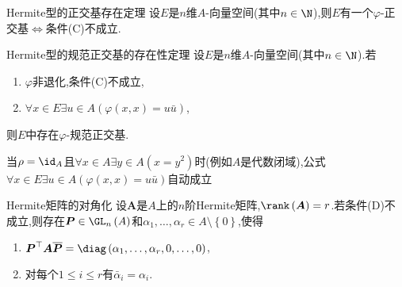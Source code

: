 \begin{theorem}{Hermite型的正交基存在定理}{}
	设$E$是$n$维$A$-向量空间(其中$n\in\N$),则$E$有一个$\varphi$-正交基$\iff$条件(C)不成立.
\end{theorem}

\begin{corollary}{Hermite型的规范正交基的存在性定理}{}
	设$E$是$n$维$A$-向量空间(其中$n\in\N$).若
	\begin{enumerate}
		\item $\varphi$非退化,条件(C)不成立,
		\item $\forall x\in E\exists u\in A\left(\varphi\left(x,x\right)=u\bar{u}\right)$,
	\end{enumerate}
	则$E$中存在$\varphi$-规范正交基.
\end{corollary}

\begin{remark}{}{}
	当$\rho=\id_{A}$且$\forall x\in A\exists y\in A\left(x=y^{2}\right)$时(例如$A$是代数闭域),公式$\forall x\in E\exists u\in A\left(\varphi\left(x,x\right)=u\bar{u}\right)$自动成立
\end{remark}

\begin{corollary}{Hermite矩阵的对角化}{}
	设$\boldsymbol{A}$是$A$上的$n$阶Hermite矩阵,$\rank\left(\boldsymbol{A}\right)=r$.若条件(D)不成立,则存在$\boldsymbol{P}\in\GL_{n}\left(A\right)$和$\alpha_{1},\ldots,\alpha_{r}\in A\setminus\left\{0\right\}$,使得
	\begin{enumerate}
		\item $\boldsymbol{P}^{\top}\boldsymbol{A}\overline{\boldsymbol{P}}=\diag\left(\alpha_{1},\ldots,\alpha_{r},0,\ldots,0\right)$,
		\item 对每个$1\leq i\leq r$有$\bar{\alpha}_{i}=\alpha_{i}$.
	\end{enumerate}
\end{corollary}

